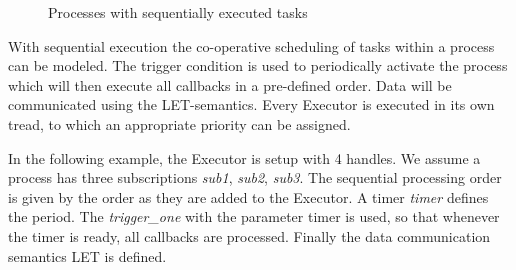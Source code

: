 \begin{figure}[t!]
\begin{minipage}[t]{0.5\textwidth}
        \caption{Processes with sequentially executed tasks}
        \label{fig:sch2} %
    \end{minipage}
\end{figure}

With sequential execution the co-operative scheduling of tasks within a process can be modeled. The trigger condition is used to periodically activate the process which will then execute all callbacks in a pre-defined order. Data will be communicated using the LET-semantics. Every Executor is executed in its own tread, to which an appropriate priority can be assigned.

In the following example, the Executor is setup with 4 handles. We assume a process has three subscriptions \textit{sub1}, \textit{sub2}, \textit{sub3}. The sequential processing order is given by the order as they are added to the Executor. A timer \textit{timer} defines the period. The \textit{trigger\_one} with the parameter timer is used, so that whenever the timer is ready, all callbacks are processed. Finally the data communication semantics LET is defined.

